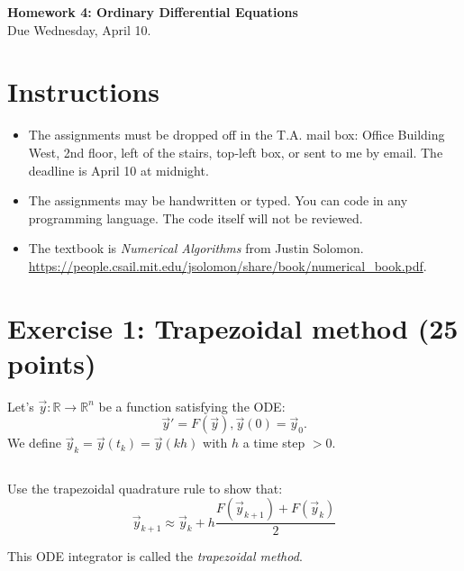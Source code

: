 


\begin{center}
{\large\textbf{Homework 4: Ordinary Differential Equations}}\\
Due Wednesday, April 10.
\end{center}

\noindent\makebox[\linewidth]{\rule{\linewidth}{0.6pt}}
 
\section*{Instructions}

\begin{itemize}
\item The assignments must be dropped off in the T.A. mail box: Office Building West, 2nd floor, left of the stairs, top-left box, or sent to me by email. The deadline is April 10 at midnight.
\item The assignments may be handwritten or typed. You can code in any programming language. The code itself will not be reviewed. 
\item The textbook is \emph{Numerical Algorithms} from Justin Solomon.\\ \url{https://people.csail.mit.edu/jsolomon/share/book/numerical_book.pdf}.  
\end{itemize}



\noindent\makebox[\linewidth]{\rule{\linewidth}{0.6pt}}

\section*{Exercise 1: Trapezoidal method \normalsize \textnormal(25 points)}

Let's $\vec{y}: \mathds{R} \rightarrow \mathds{R}^n$ be a function satisfying the ODE:
$$\vec{y}'= F(\vec{y}), \vec{y}(0) = \vec{y}_0.$$
We define $\vec{y}_k = \vec{y}(t_k) = \vec{y}(kh)$ with $h$ a time step $> 0$.

\subsection{} Use the trapezoidal quadrature rule to show that:
$$\vec{y}_{k+1} \approx \vec{y}_k + h\frac{F(\vec{y}_{k+1}) + F(\vec{y}_k)}{2}$$

This ODE integrator is called the \emph{trapezoidal method}.

